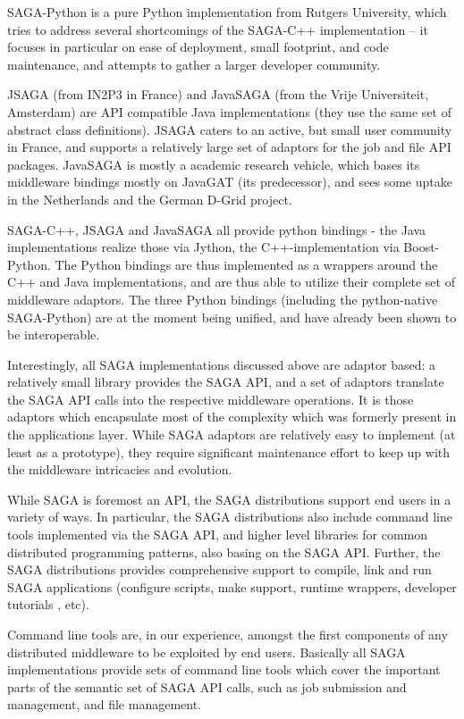 \documentclass[twocolumn]{svjour3}       %
\begin{document}
SAGA-Python is a pure Python implementation from Rutgers University, which tries to address several shortcomings of the SAGA-C++ implementation -- it focuses in particular on ease of deployment, small footprint, and code maintenance, and attempts to gather a larger developer community.
  
JSAGA (from IN2P3 in France) and JavaSAGA (from the Vrije Universiteit, Amsterdam) are API compatible Java implementations (they use the same set of abstract class definitions).  JSAGA caters to an active, but small user community in France, and supports a relatively large set of adaptors for the job and file API packages.  JavaSAGA is mostly a academic research vehicle, which bases its middleware bindings mostly on JavaGAT (its predecessor), and sees some uptake in the Netherlands and the German D-Grid project.

SAGA-C++, JSAGA and JavaSAGA all provide python bindings - the Java implementations realize those via Jython, the C++-implementation via Boost-Python.    The Python bindings are thus implemented as a wrappers around the C++ and Java implementations, and are thus able to utilize their complete set of middleware adaptors. The three Python bindings (including the python-native SAGA-Python) are at the moment being unified, and have already been shown to be interoperable.

Interestingly, all SAGA implementations discussed above are adaptor based: a relatively small library provides the SAGA API, and a set of adaptors translate the SAGA API calls into the respective middleware operations.  It is those adaptors which encapsulate most of the complexity which was formerly present in the applications layer.  While SAGA adaptors are relatively easy to implement (at least as a prototype), they require significant maintenance effort to keep up with the middleware intricacies and evolution.

While SAGA is foremost an API, the SAGA distributions support end users in a variety of ways.  In particular, the SAGA distributions also include command line tools implemented via the SAGA API, and higher level libraries for common distributed programming patterns, also basing on the SAGA API.  Further, the SAGA distributions provides comprehensive support to compile, link and run SAGA applications (configure scripts, make support, runtime wrappers, developer tutorials , etc).

Command line tools are, in our experience, amongst the first components of any distributed middleware to be exploited by end users.  Basically all SAGA implementations provide sets of command line tools which cover the important parts of the semantic set of SAGA API calls, such as job submission and management, and file management.
\end{document}
